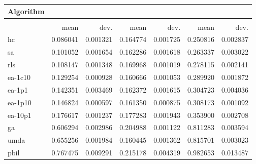 \begin{tabular}{@{} l *{6}{>{{}}N{1}{2}} @{}}
\toprule
{Algorithm} &  \\
\midrule
&  &  &  \\
\midrule
& {mean} & {dev.} & {mean} & {dev.} & {mean} & {dev.} \\
\midrule
hc & 0.086041 & 0.001321 & 0.164774 & 0.001725 & 0.250816 & 0.002837 \\
sa & 0.101052 & 0.001654 & 0.162286 & 0.001618 & 0.263337 & 0.003022 \\
rls & 0.108147 & 0.001348 & 0.169968 & 0.001019 & 0.278115 & 0.002141 \\
ea-1c10 & 0.129254 & 0.000928 & 0.160666 & 0.001053 & 0.289920 & 0.001872 \\
ea-1p1 & 0.142351 & 0.003469 & 0.162372 & 0.001615 & 0.304723 & 0.004036 \\
ea-1p10 & 0.146824 & 0.000597 & 0.161350 & 0.000875 & 0.308173 & 0.001092 \\
ea-10p1 & 0.176617 & 0.001237 & 0.177283 & 0.001943 & 0.353900 & 0.002708 \\
ga & 0.606294 & 0.002986 & 0.204988 & 0.001122 & 0.811283 & 0.003594 \\
umda & 0.655256 & 0.001984 & 0.160445 & 0.001362 & 0.815701 & 0.003023 \\
pbil & 0.767475 & 0.009291 & 0.215178 & 0.004319 & 0.982653 & 0.013487 \\
\bottomrule
\end{tabular}
